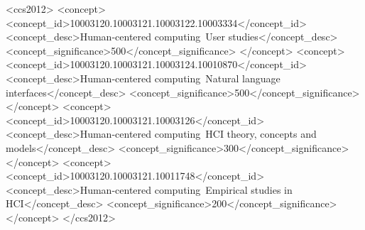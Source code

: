 \documentclass[sigconf]{acmart}
\begin{document}
\newcommand{\simo}[1]{\textcolor{blue}{}}
\newcommand{\dani}[1]{\textcolor{red}{}}

\begin{CCSXML}
<ccs2012>
   <concept>
       <concept_id>10003120.10003121.10003122.10003334</concept_id>
       <concept_desc>Human-centered computing~User studies</concept_desc>
       <concept_significance>500</concept_significance>
       </concept>
   <concept>
       <concept_id>10003120.10003121.10003124.10010870</concept_id>
       <concept_desc>Human-centered computing~Natural language interfaces</concept_desc>
       <concept_significance>500</concept_significance>
       </concept>
   <concept>
       <concept_id>10003120.10003121.10003126</concept_id>
       <concept_desc>Human-centered computing~HCI theory, concepts and models</concept_desc>
       <concept_significance>300</concept_significance>
       </concept>
   <concept>
       <concept_id>10003120.10003121.10011748</concept_id>
       <concept_desc>Human-centered computing~Empirical studies in HCI</concept_desc>
       <concept_significance>200</concept_significance>
       </concept>
 </ccs2012>
\end{CCSXML}



\end{document}
